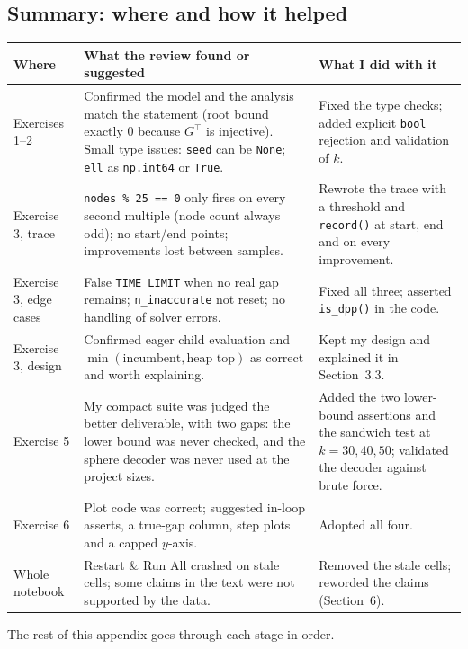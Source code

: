\documentclass[11pt,a4paper]{article}
\begin{document}
\subsection{Summary: where and how it helped}

\begin{center}
\small
\begin{tabular}{p{}p{}p{}}
\toprule
Where & What the review found or suggested & What I did with it\\
\midrule
Exercises 1--2 & Confirmed the model and the analysis match the statement (root bound exactly 0 because $G^\top$ is injective). Small type issues: \texttt{seed} can be \texttt{None}; \texttt{ell} as \texttt{np.int64} or \texttt{True}. & Fixed the type checks; added explicit \texttt{bool} rejection and validation of $k$.\\
Exercise 3, trace & \texttt{nodes \% 25 == 0} only fires on every second multiple (node count always odd); no start/end points; improvements lost between samples. & Rewrote the trace with a threshold and \texttt{record()} at start, end and on every improvement.\\
Exercise 3, edge cases & False \texttt{TIME\_LIMIT} when no real gap remains; \texttt{n\_inaccurate} not reset; no handling of solver errors. & Fixed all three; asserted \texttt{is\_dpp()} in the code.\\
Exercise 3, design & Confirmed eager child evaluation and $\min(\text{incumbent},\text{heap top})$ as correct and worth explaining. & Kept my design and explained it in Section~3.3.\\
Exercise 5 & My compact suite was judged the better deliverable, with two gaps: the lower bound was never checked, and the sphere decoder was never used at the project sizes. & Added the two lower-bound assertions and the sandwich test at $k=30,40,50$; validated the decoder against brute force.\\
Exercise 6 & Plot code was correct; suggested in-loop asserts, a true-gap column, step plots and a capped $y$-axis. & Adopted all four.\\
Whole notebook & Restart \& Run All crashed on stale cells; some claims in the text were not supported by the data. & Removed the stale cells; reworded the claims (Section~6).\\
\bottomrule
\end{tabular}
\end{center}

The rest of this appendix goes through each stage in order.
\end{document}
